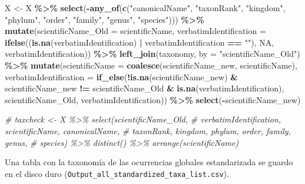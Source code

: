 \documentclass[sn-apa,pdflatex]{sn-jnl}
\newenvironment{Shaded}{\begin{snugshade}}{\end{snugshade}}
\newcommand{\AttributeTok}[1]{\textcolor[rgb]{0.13,0.29,0.53}{#1}}
\newcommand{\CommentTok}[1]{\textcolor[rgb]{0.56,0.35,0.01}{\textit{#1}}}
\newcommand{\ConstantTok}[1]{\textcolor[rgb]{0.56,0.35,0.01}{#1}}
\newcommand{\FunctionTok}[1]{\textcolor[rgb]{0.13,0.29,0.53}{\textbf{#1}}}
\newcommand{\NormalTok}[1]{#1}
\newcommand{\OtherTok}[1]{\textcolor[rgb]{0.56,0.35,0.01}{#1}}
\newcommand{\SpecialCharTok}[1]{\textcolor[rgb]{0.81,0.36,0.00}{\textbf{#1}}}
\newcommand{\StringTok}[1]{\textcolor[rgb]{0.31,0.60,0.02}{#1}}
\begin{document}
\begin{Shaded}
\begin{Highlighting}[]
\NormalTok{X }\OtherTok{\textless{}{-}}\NormalTok{ X }\SpecialCharTok{\%\textgreater{}\%}
    \FunctionTok{select}\NormalTok{(}\SpecialCharTok{{-}}\FunctionTok{any\_of}\NormalTok{(}\FunctionTok{c}\NormalTok{(}\StringTok{"canonicalName"}\NormalTok{, }\StringTok{"taxonRank"}\NormalTok{, }\StringTok{"kingdom"}\NormalTok{,}
        \StringTok{"phylum"}\NormalTok{, }\StringTok{"order"}\NormalTok{, }\StringTok{"family"}\NormalTok{, }\StringTok{"genus"}\NormalTok{, }\StringTok{"species"}\NormalTok{))) }\SpecialCharTok{\%\textgreater{}\%}
    \FunctionTok{mutate}\NormalTok{(}\AttributeTok{scientificName\_Old =}\NormalTok{ scientificName, }\AttributeTok{verbatimIdentification =} \FunctionTok{ifelse}\NormalTok{((}\FunctionTok{is.na}\NormalTok{(verbatimIdentification) }\SpecialCharTok{|}
\NormalTok{        verbatimIdentification }\SpecialCharTok{==} \StringTok{""}\NormalTok{), }\ConstantTok{NA}\NormalTok{, verbatimIdentification)) }\SpecialCharTok{\%\textgreater{}\%}
    \FunctionTok{left\_join}\NormalTok{(taxonomy, }\AttributeTok{by =} \StringTok{"scientificName\_Old"}\NormalTok{) }\SpecialCharTok{\%\textgreater{}\%}
    \FunctionTok{mutate}\NormalTok{(}\AttributeTok{scientificName =} \FunctionTok{coalesce}\NormalTok{(scientificName\_new, scientificName),}
        \AttributeTok{verbatimIdentification =} \FunctionTok{if\_else}\NormalTok{(}\SpecialCharTok{!}\FunctionTok{is.na}\NormalTok{(scientificName\_new) }\SpecialCharTok{\&}
\NormalTok{            scientificName\_new }\SpecialCharTok{!=}\NormalTok{ scientificName\_Old }\SpecialCharTok{\&} \FunctionTok{is.na}\NormalTok{(verbatimIdentification),}
\NormalTok{            scientificName\_Old, verbatimIdentification)) }\SpecialCharTok{\%\textgreater{}\%}
    \FunctionTok{select}\NormalTok{(}\SpecialCharTok{{-}}\NormalTok{scientificName\_new)}

\CommentTok{\# taxcheck \textless{}{-} X \%\textgreater{}\% select(scientificName\_Old,}
\CommentTok{\# verbatimIdentification, scientificName, canonicalName,}
\CommentTok{\# taxonRank, kingdom, phylum, order, family, genus,}
\CommentTok{\# species) \%\textgreater{}\% distinct() \%\textgreater{}\% arrange(scientificName)}
\end{Highlighting}
\end{Shaded}

Una tabla con la taxonomía de las ocurrencias globales estandarizada se
guardo en el disco duro
(\texttt{Output\_all\_standardized\_taxa\_list.csv}).
\end{document}
